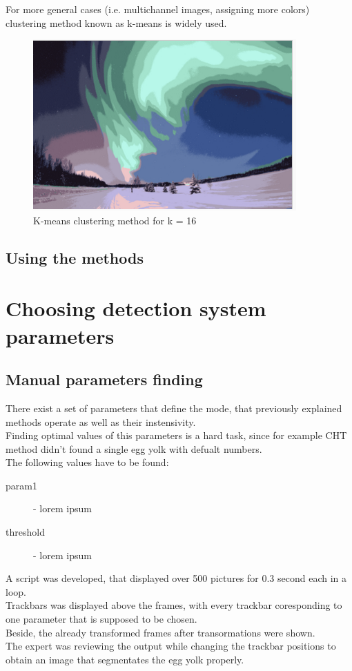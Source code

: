 \documentclass[12pt,twoside,a4paper]{article}
\begin{document}
For more general cases (i.e. multichannel images, assigning more colors) clustering method known as k-means is widely used.\cite{lesscv}
 
\begin{figure}[H]
\centering
\includegraphics[width=0.4\paperwidth]{kmeans}
\caption{K-means clustering method for k = 16\cite{segm}}
\end{figure}
\subsection{Using the methods}


\section{Choosing detection system parameters}
\subsection{Manual parameters finding}

There exist a set of parameters that define the mode, that previously explained methods operate as well as their instensivity.\\
Finding optimal values of this parameters is a hard task, since for example CHT method didn't found a single egg yolk with defualt numbers.\\
The following values have to be found:
\begin{description}
\item[param1] - lorem ipsum
\item[threshold] - lorem ipsum
\end{description}

A script was developed, that displayed over 500 pictures for 0.3 second each in a loop.\\
Trackbars was displayed above the frames, with every trackbar coresponding to one parameter that is supposed to be chosen.\\
Beside, the already transformed frames after transormations were shown.\\
The expert was reviewing the output while changing the trackbar positions to obtain an image that segmentates the egg yolk properly.\\
\end{document}
